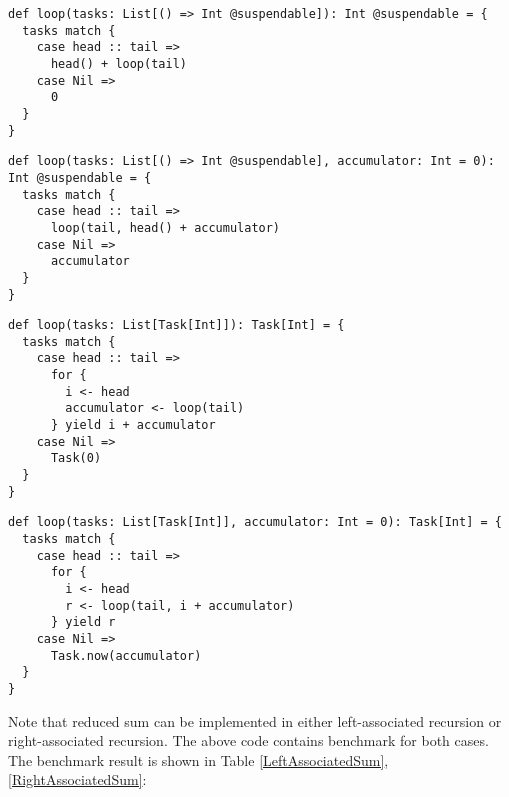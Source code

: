 \begin{lstlisting}[caption={Left-associated sum based on Scala Continuation plug-in},label={LeftAssociatedSum.scalaContinuation}]
def loop(tasks: List[() => Int @suspendable]): Int @suspendable = {
  tasks match {
    case head :: tail =>
      head() + loop(tail)
    case Nil =>
      0
  }
}
\end{lstlisting}

\begin{lstlisting}[caption={Right-associated sum based on Scala Continuation plug-in},label={RightAssociatedSum.scalaContinuation}]
def loop(tasks: List[() => Int @suspendable], accumulator: Int = 0): Int @suspendable = {
  tasks match {
    case head :: tail =>
      loop(tail, head() + accumulator)
    case Nil =>
      accumulator
  }
}
\end{lstlisting}

\begin{lstlisting}[caption={Left-associated sum based on \lstinline{for} comprehension},label={LeftAssociatedSum.scalaz}]
def loop(tasks: List[Task[Int]]): Task[Int] = {
  tasks match {
    case head :: tail =>
      for {
        i <- head
        accumulator <- loop(tail)
      } yield i + accumulator
    case Nil =>
      Task(0)
  }
}
\end{lstlisting}

\begin{lstlisting}[caption={Right-associated sum based on \lstinline{for} comprehension},label={RightAssociatedSum.scalaz}]
def loop(tasks: List[Task[Int]], accumulator: Int = 0): Task[Int] = {
  tasks match {
    case head :: tail =>
      for {
        i <- head
        r <- loop(tail, i + accumulator)
      } yield r
    case Nil =>
      Task.now(accumulator)
  }
}
\end{lstlisting}

Note that reduced sum can be implemented in either left-associated recursion or right-associated recursion. The above code contains benchmark for both cases. The benchmark result is shown in Table \ref{LeftAssociatedSum}, \ref{RightAssociatedSum}:

